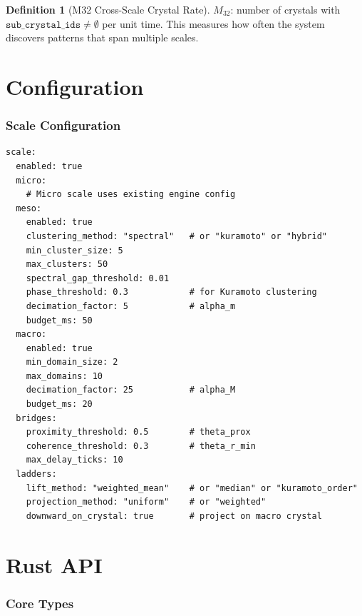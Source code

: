 \documentclass[11pt,a4paper,twoside]{article}
\theoremstyle{definition}
\newtheorem{definition}{Definition}[section]
\theoremstyle{plain}
\theoremstyle{remark}
\begin{document}
\begin{definition}[M32 Cross-Scale Crystal Rate]\label{def:m32}
$M_{32}$: number of crystals with $\mathtt{sub\_crystal\_ids} \neq
\emptyset$ per unit time. This measures how often the system discovers
patterns that span multiple scales.
\end{definition}


\part{Configuration}\label{part:config}

\section{Scale Configuration}\label{sec:scaleconfig}

\begin{verbatim}
scale:
  enabled: true
  micro:
    # Micro scale uses existing engine config
  meso:
    enabled: true
    clustering_method: "spectral"   # or "kuramoto" or "hybrid"
    min_cluster_size: 5
    max_clusters: 50
    spectral_gap_threshold: 0.01
    phase_threshold: 0.3            # for Kuramoto clustering
    decimation_factor: 5            # alpha_m
    budget_ms: 50
  macro:
    enabled: true
    min_domain_size: 2
    max_domains: 10
    decimation_factor: 25           # alpha_M
    budget_ms: 20
  bridges:
    proximity_threshold: 0.5        # theta_prox
    coherence_threshold: 0.3        # theta_r_min
    max_delay_ticks: 10
  ladders:
    lift_method: "weighted_mean"    # or "median" or "kuramoto_order"
    projection_method: "uniform"    # or "weighted"
    downward_on_crystal: true       # project on macro crystal
\end{verbatim}


\part{Rust API}\label{part:api}

\section{Core Types}\label{sec:api:types}
\end{document}
